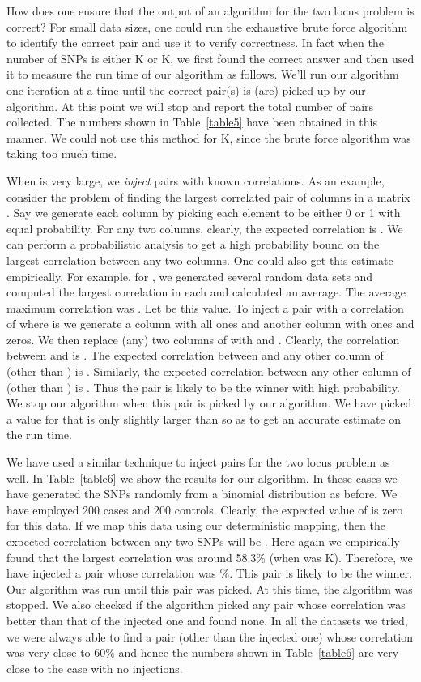 \documentclass{article}
\theoremstyle{definition}
\theoremstyle{remark}
\begin{document}
How does one ensure that the output of an algorithm for the two locus problem is correct? For small data sizes, one could run the exhaustive brute force algorithm to identify the correct pair and use it to verify correctness. In fact when the number of SNPs is either K or K, we first found the correct answer and then used it to measure the run time of our algorithm as follows. We'll run our algorithm one iteration at a time until the correct pair(s) is (are) picked up by our algorithm. At this point we will stop and report the total number of pairs collected. The numbers shown in Table~\ref{table5} have been obtained in this manner. We could not use this method for K, since the brute force algorithm was taking too much time.

When  is very large, we {\em inject} pairs with known correlations. As an example, consider the problem of finding the largest correlated pair of columns in a  matrix . Say we generate each column by picking each element to be either 0 or 1 with equal probability. For any two columns, clearly, the expected correlation is . We can perform a probabilistic analysis to get a high probability bound on the largest correlation between any two columns. One could also get this estimate empirically. For example, for , we generated several random data sets and computed the largest correlation in each and calculated an average. The average maximum correlation was . Let  be this value. To inject a pair with a correlation of  where  is  we generate a column  with all ones and another column  with  ones and  zeros. We then replace (any) two columns of  with  and . Clearly, the correlation between  and  is . The expected correlation between  and any other column of  (other than ) is . Similarly, the expected correlation between  any other column of  (other than ) is . Thus the pair  is likely to be the winner with high probability. We stop our algorithm when this pair is picked by our algorithm. We have picked a value for  that is only slightly larger than  so as to get an accurate estimate on the run time.

We have used a similar technique to inject pairs for the two locus problem as well. In Table~\ref{table6} we show the results for our algorithm. In these cases we have generated the SNPs randomly from a binomial distribution as before. We have employed 200 cases and 200 controls. Clearly, the expected value of  is zero for this data. If we map this data using our deterministic mapping, then the expected correlation between any two SNPs will be . Here again we empirically found that the largest correlation was around 58.3\% (when  was K). Therefore, we  have injected a pair whose correlation was \%. This pair is likely to be the winner. Our algorithm was run until this pair was picked. At this time, the algorithm was stopped. We also checked if the algorithm picked any pair whose correlation was better than that of the injected one and found none. In all the datasets we tried, we were always able to find a pair (other than the injected one) whose correlation was very close to 60\% and hence the numbers shown in Table~\ref{table6} are very close to the case with no injections.
\end{document}
